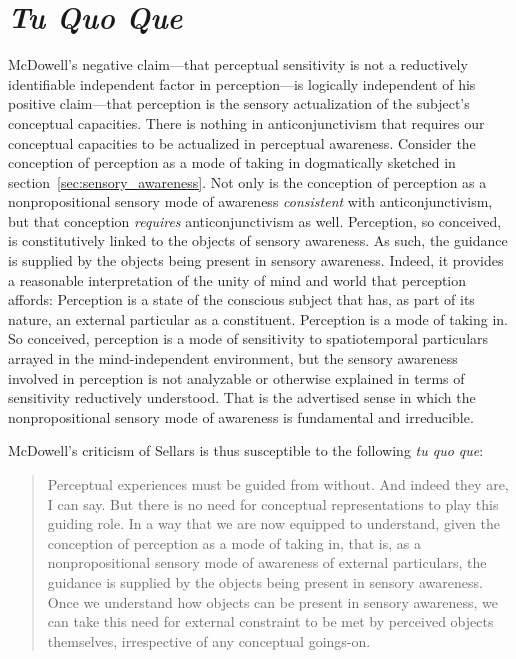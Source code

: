 \documentclass[12pt]{article}
\begin{document}

\section{\emph{Tu Quo Que}} %
\label{sec:tu_quo_que}

McDowell's negative claim---that perceptual sensitivity is not a reductively identifiable independent factor in perception---is logically independent of his positive claim---that perception is the sensory actualization of the subject's conceptual capacities. There is nothing in anticonjunctivism that requires our conceptual capacities to be actualized in perceptual awareness. Consider the conception of perception as a mode of taking in dogmatically sketched in section~\ref{sec:sensory_awareness}. Not only is the conception of perception as a nonpropositional sensory mode of awareness \emph{consistent} with anticonjunctivism, but that conception \emph{requires} anticonjunctivism as well. Perception, so conceived, is constitutively linked to the objects of sensory awareness. As such, the guidance is supplied by the objects being present in sensory awareness. Indeed, it provides a reasonable interpretation of the unity of mind and world that perception affords: Perception is a state of the conscious subject that has, as part of its nature, an external particular as a constituent. Perception is a mode of taking in. So conceived, perception is a mode of sensitivity to spatiotemporal particulars arrayed in the mind-independent environment, but the sensory awareness involved in perception is not analyzable or otherwise explained in terms of sensitivity reductively understood. That is the advertised sense in which the nonpropositional sensory mode of awareness is fundamental and irreducible. 

McDowell's criticism of Sellars is thus susceptible to the following \emph{tu quo que}: 
\begin{quote}
    Perceptual experiences must be guided from without. And indeed they are, I can say. But there is no need for conceptual representations to play this guiding role. In a way that we are now equipped to understand, given the conception of perception as a mode of taking in, that is, as a nonpropositional sensory mode of awareness of external particulars, the guidance is supplied by the objects being present in sensory awareness. Once we understand how objects can be present in sensory awareness, we can take this need for external constraint to be met by perceived objects themselves, irrespective of any conceptual goings-on.
\end{quote}
\end{document}
